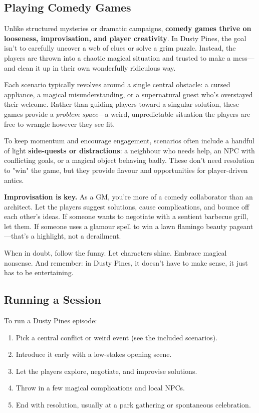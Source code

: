 \subsection{Playing Comedy Games}

Unlike structured mysteries or dramatic campaigns, \textbf{comedy games thrive on looseness, improvisation, and player creativity}. In Dusty Pines, the goal isn't to carefully uncover a web of clues or solve a grim puzzle. Instead, the players are thrown into a chaotic magical situation and trusted to make a mess---and clean it up in their own wonderfully ridiculous way.

Each scenario typically revolves around a single central obstacle: a cursed appliance, a magical misunderstanding, or a supernatural guest who’s overstayed their welcome. Rather than guiding players toward a singular solution, these games provide a \textit{problem space}---a weird, unpredictable situation the players are free to wrangle however they see fit.

To keep momentum and encourage engagement, scenarios often include a handful of light \textbf{side-quests or distractions}: a neighbour who needs help, an NPC with conflicting goals, or a magical object behaving badly. These don't need resolution to "win" the game, but they provide flavour and opportunities for player-driven antics.

\textbf{Improvisation is key.} As a GM, you’re more of a comedy collaborator than an architect. Let the players suggest solutions, cause complications, and bounce off each other’s ideas. If someone wants to negotiate with a sentient barbecue grill, let them. If someone uses a glamour spell to win a lawn flamingo beauty pageant---that’s a highlight, not a derailment.

When in doubt, follow the funny. Let characters shine. Embrace magical nonsense. And remember: in Dusty Pines, it doesn’t have to make sense, it just has to be entertaining.


\subsection{Running a Session}

To run a Dusty Pines episode:

\begin{enumerate}
  \item Pick a central conflict or weird event (see the included scenarios).
  \item Introduce it early with a low-stakes opening scene.
  \item Let the players explore, negotiate, and improvise solutions.
  \item Throw in a few magical complications and local NPCs.
  \item End with resolution, usually at a park gathering or spontaneous celebration.
\end{enumerate}

